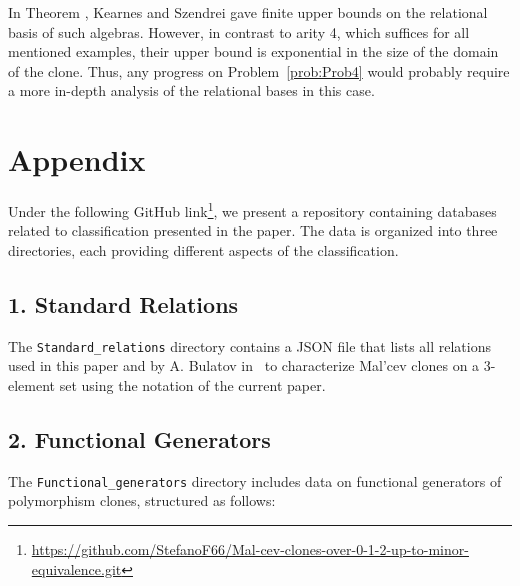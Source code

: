 \documentclass[12pt]{amsart}
\theoremstyle{definition}
\theoremstyle{definition}
\begin{document}
In Theorem \cite[Theorem 4.3]{KS-parallelogramterms}, Kearnes and Szendrei gave finite upper bounds on the relational basis of such algebras. However, in contrast to arity 4, which suffices for all mentioned examples, their upper bound is exponential in the size of the domain of the clone. Thus, any progress on Problem~\ref{prob:Prob4} would probably require a more in-depth analysis of the relational bases in this case.





\appendix

\section{Appendix}\label{sec:appendix}

Under the following GitHub link\footnote{\href{https://github.com/StefanoF66/Mal-cev-clones-over-0-1-2-up-to-minor-equivalence.git}{https://github.com/StefanoF66/Mal-cev-clones-over-0-1-2-up-to-minor-equivalence.git}}, we present a repository containing databases related to classification presented in the paper. The data is organized into three directories, each providing different aspects of the classification. 

\subsection*{1. Standard Relations}  
The \texttt{Standard\_relations} directory contains a JSON file that lists all relations used in this paper and by A. Bulatov in~\cite{BulatovMaltsev} to characterize Mal'cev clones on a 3-element set using the notation of the current paper.

\subsection*{2. Functional Generators}  
The \texttt{Functional\_generators} directory includes data on functional generators of polymorphism clones, structured as follows:
\end{document}
